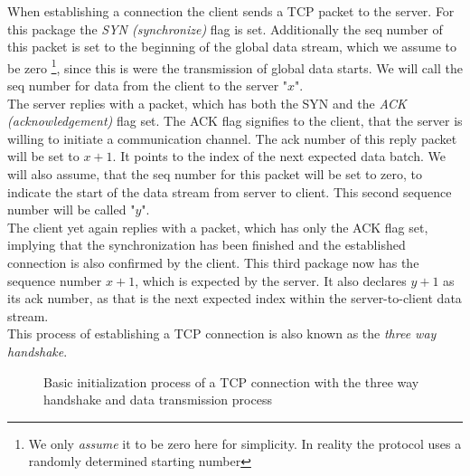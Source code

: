 When establishing a connection the client sends a TCP packet to the server. For this package the \textit{SYN (synchronize)} flag is set. Additionally the seq number of this packet is set to the beginning of the global data stream, which we assume to be zero \footnote{We only \textit{assume} it to be zero here for simplicity. In reality the protocol uses a randomly determined starting number}, since this is were the transmission of global data starts. We will call the seq number for data from the client to the server "$x$".\\
The server replies with a packet, which has both the SYN and the \textit{ACK (acknowledgement)} flag set. The ACK flag signifies to the client, that the server is willing to initiate a communication channel. The ack number of this reply packet will be set to $x+1$. It points to the index of the next expected data batch. We will also assume, that the seq number for this packet will be set to zero, to indicate the start of the data stream from server to client. This second sequence number will be called "$y$".\\
The client yet again replies with a packet, which has only the ACK flag set, implying that the synchronization has been finished and the established connection is also confirmed by the client. This third package now has the sequence number $x+1$, which is expected by the server. It also declares $y+1$ as its ack number, as that is the next expected index within the server-to-client data stream.\\
This process of establishing a TCP connection is also known as the \textit{three way handshake}.\par

\setlength{\fboxsep}{2pt}%
\setlength{\fboxrule}{0pt}%
\begin{figure}[h]
\centering
{}
\caption[Structure of a TCP connection]{Basic initialization process of a TCP connection with the three way handshake and data transmission process}
\end{figure}

